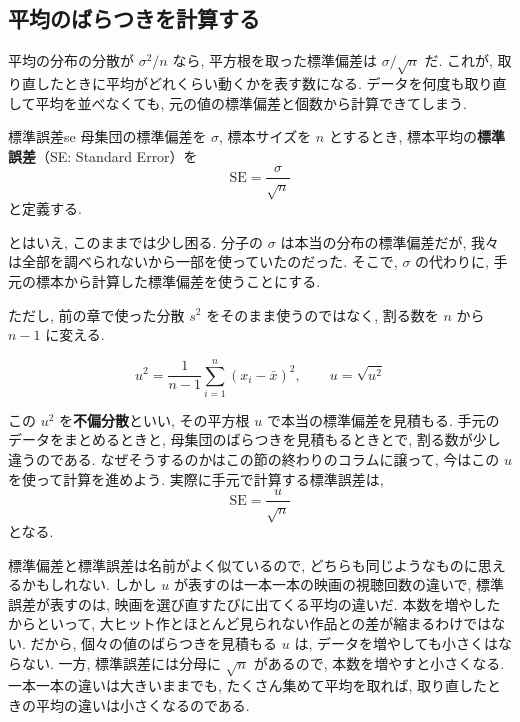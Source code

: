   \subsection{平均のばらつきを計算する}

    平均の分布の分散が $\sigma^2/n$ なら, 平方根を取った標準偏差は $\sigma/\sqrt{n}$ だ.
    これが, 取り直したときに平均がどれくらい動くかを表す数になる.
    データを何度も取り直して平均を並べなくても, 元の値の標準偏差と個数から計算できてしまう.

    \begin{defi}{標準誤差}{se}
      母集団の標準偏差を $\sigma$, 標本サイズを $n$ とするとき, 標本平均の\textbf{標準誤差}（SE: Standard Error）を
      \[
        \mathrm{SE} = \frac{\sigma}{\sqrt{n}}
      \]
      と定義する.
    \end{defi}

    とはいえ, このままでは少し困る.
    分子の $\sigma$ は本当の分布の標準偏差だが, 我々は全部を調べられないから一部を使っていたのだった.
    そこで, $\sigma$ の代わりに, 手元の標本から計算した標準偏差を使うことにする.

    ただし, 前の章で使った分散 $s^2$ をそのまま使うのではなく, 割る数を $n$ から $n-1$ に変える.

    \[
      u^2 = \frac{1}{n-1}\sum_{i=1}^{n}(x_i-\bar{x})^2, \qquad u = \sqrt{u^2}
    \]

    この $u^2$ を\textbf{不偏分散}といい, その平方根 $u$ で本当の標準偏差を見積もる.
    手元のデータをまとめるときと, 母集団のばらつきを見積もるときとで, 割る数が少し違うのである.
    なぜそうするのかはこの節の終わりのコラムに譲って, 今はこの $u$ を使って計算を進めよう.
    実際に手元で計算する標準誤差は,
    \[
      \mathrm{SE} = \frac{u}{\sqrt{n}}
    \]
    となる.

    標準偏差と標準誤差は名前がよく似ているので, どちらも同じようなものに思えるかもしれない.
    しかし $u$ が表すのは一本一本の映画の視聴回数の違いで, 標準誤差が表すのは, 映画を選び直すたびに出てくる平均の違いだ.
    本数を増やしたからといって, 大ヒット作とほとんど見られない作品との差が縮まるわけではない.
    だから, 個々の値のばらつきを見積もる $u$ は, データを増やしても小さくはならない.
    一方, 標準誤差には分母に $\sqrt{n}$ があるので, 本数を増やすと小さくなる.
    一本一本の違いは大きいままでも, たくさん集めて平均を取れば, 取り直したときの平均の違いは小さくなるのである.

